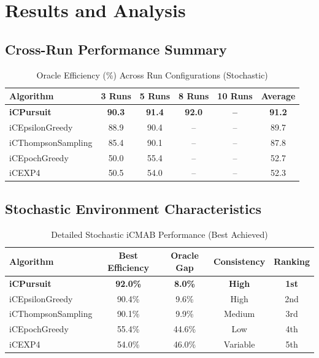 \documentclass[12pt,a4paper]{article}
\newcommand{\primarytext}[1]{\textcolor{primaryblue}{\textbf{#1}}}
\begin{document}
\section{Results and Analysis}

\begin{tcolorbox}[colback=tableheader,colframe=primaryblue,title=\textbf{Primary iCMAB Performance Results}]
\subsection{Cross-Run Performance Summary}
\begin{table}[H]
\centering
\caption{Oracle Efficiency (\%) Across Run Configurations (Stochastic)}
\begin{tabular}{@{}lccccc@{}}
\toprule
\textbf{Algorithm} & \textbf{3 Runs} & \textbf{5 Runs} & \textbf{8 Runs} & \textbf{10 Runs} & \textbf{Average} \\
\midrule
\primarytext{iCPursuit} & \primarytext{90.3} & \primarytext{91.4} & \primarytext{92.0} & \primarytext{--} & \primarytext{91.2} \\
iCEpsilonGreedy & 88.9 & 90.4 & -- & -- & 89.7 \\
iCThompsonSampling & 85.4 & 90.1 & -- & -- & 87.8 \\
iCEpochGreedy & 50.0 & 55.4 & -- & -- & 52.7 \\
iCEXP4 & 50.5 & 54.0 & -- & -- & 52.3 \\
\bottomrule
\end{tabular}
\end{table}
\end{tcolorbox}

\subsection{Stochastic Environment Characteristics}
\begin{table}[H]
\centering
\caption{Detailed Stochastic iCMAB Performance (Best Achieved)}
\begin{tabular}{@{}lcccc@{}}
\toprule
\textbf{Algorithm} & \textbf{Best Efficiency} & \textbf{Oracle Gap} & \textbf{Consistency} & \textbf{Ranking} \\
\midrule
\primarytext{iCPursuit} & \primarytext{92.0\%} & \primarytext{8.0\%} & \primarytext{High} & \primarytext{1st} \\
iCEpsilonGreedy & 90.4\% & 9.6\% & High & 2nd \\
iCThompsonSampling & 90.1\% & 9.9\% & Medium & 3rd \\
iCEpochGreedy & 55.4\% & 44.6\% & Low & 4th \\
iCEXP4 & 54.0\% & 46.0\% & Variable & 5th \\
\bottomrule
\end{tabular}
\end{table}
\end{document}

